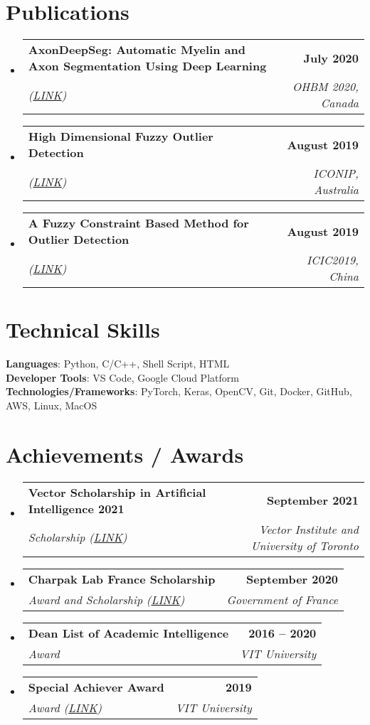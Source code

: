 \documentclass[letterpaper,11pt]{article}
\makeatletter
\newcommand{\resumeSubheading}[4]{
  \vspace{-2pt}\item
    \begin{tabular*}{1.0\textwidth}[t]{l@{\extracolsep{\fill}}r}
      \textbf{#1} & \textbf{\small #2} \\
      \textit{\small#3} & \textit{\small #4} \\
    \end{tabular*}\vspace{-7pt}
}
\newcommand{\resumeSubHeadingListStart}{\begin{itemize}[leftmargin=0.0in, label={}]}
\newcommand{\resumeSubHeadingListEnd}{\end{itemize}}
\makeatother
\begin{document}
\section{Publications}
    \resumeSubHeadingListStart
        \resumeSubheading{AxonDeepSeg: Automatic Myelin and Axon Segmentation Using Deep Learning}{July 2020}{(\href{https://cdn-akamai.6connex.com/645/1827//ohbm2020_boudreau_FINAL_15921677822526191.pdf}{LINK})}{OHBM 2020, Canada}
 
        \resumeSubheading{High Dimensional Fuzzy Outlier Detection}{August 2019}{(\href{http://ajiips.com.au/papers/V16.1/v16n1_49-59.pdf}{LINK})}{ICONIP, Australia}


        \resumeSubheading{A Fuzzy Constraint Based Method for Outlier Detection}{August 2019}{(\href{https://link.springer.com/chapter/10.1007/978-3-030-26766-7_47}{LINK})}{ICIC2019, China}


    \resumeSubHeadingListEnd

\section{Technical Skills}
 \begin{itemize}[leftmargin=0.15in, label={}]
    \small{\item{
     \textbf{Languages}{: Python, C/C++, Shell Script, HTML} \\
     \textbf{Developer Tools}{: VS Code, Google Cloud Platform} \\
     \textbf{Technologies/Frameworks}{: PyTorch, Keras, OpenCV, Git, Docker, GitHub, AWS, Linux, MacOS} \\
    }}
 \end{itemize}
 \vspace{-16pt}



\section{Achievements / Awards}
    \resumeSubHeadingListStart
        \resumeSubheading{Vector Scholarship in Artificial Intelligence 2021}{September 2021}{Scholarship ({\href{https://vectorinstitute.ai/2021/05/10/newest-vector-ai-scholarship-recipients-join-growing-talent-pool-in-ontario/}{LINK}})}{Vector Institute and University of Toronto}
        \resumeSubheading{Charpak Lab France Scholarship}{September 2020}{Award and Scholarship ({\href{https://www.inde.campusfrance.org/result-of-the-charpak-lab-scholarship-programme-2019}{LINK}})}{Government of France}
        \resumeSubheading{Dean List of Academic Intelligence}{2016 -- 2020}{Award}{VIT University}
        \resumeSubheading{Special Achiever Award}{2019}{Award (\href{https://www2.slideshare.net/secret/9CIVAk7yffpwUx}{LINK})}{VIT University}
    \resumeSubHeadingListEnd
\end{document}
